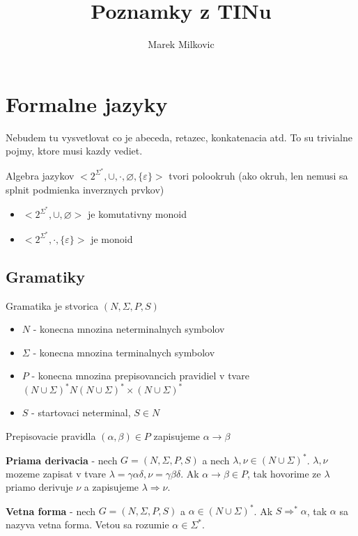 \documentclass[12pt]{article}
\begin{document}
\title{Poznamky z TINu}
\author{Marek Milkovic}
\date{}
\maketitle

\section{Formalne jazyky}
Nebudem tu vysvetlovat co je abeceda, retazec, konkatenacia atd. To su trivialne pojmy, ktore musi kazdy vediet.

Algebra jazykov $<2^{\Sigma^{*}}, \cup, \cdot, \varnothing, \{\varepsilon\}>$ tvori polookruh (ako okruh, len nemusi sa splnit
podmienka inverznych prvkov)
\begin{itemize}
	\item $<2^{\Sigma^{*}}, \cup, \varnothing>$ je komutativny monoid
	\item $<2^{\Sigma^{*}}, \cdot, \{\varepsilon\}>$ je monoid
\end{itemize}

\subsection*{Gramatiky}
Gramatika je stvorica $(N, \Sigma, P, S)$
\begin{itemize}
	\item $N$ - konecna mnozina neterminalnych symbolov
	\item $\Sigma$ - konecna mnozina terminalnych symbolov
	\item $P$ - konecna mnozina prepisovancich pravidiel v tvare $(N \cup \Sigma)^{*}N(N \cup \Sigma)^{*} \times (N \cup \Sigma)^{*}$
	\item $S$ - startovaci neterminal, $S \in N$
\end{itemize}

Prepisovacie pravidla $(\alpha, \beta) \in P$ zapisujeme $\alpha \to \beta$

\textbf{Priama derivacia} - nech $G = (N, \Sigma, P, S)$ a nech $\lambda, \nu \in (N \cup \Sigma)^{*}$.
$\lambda,\nu$ mozeme zapisat v tvare $\lambda = \gamma\alpha\delta, \nu = \gamma\beta\delta$. Ak $\alpha \to \beta \in P$,
tak hovorime ze $\lambda$ priamo derivuje $\nu$ a zapisujeme $\lambda \Rightarrow \nu$.

\textbf{Vetna forma} - nech $G = (N, \Sigma, P, S)$ a $\alpha \in (N \cup \Sigma)^{*}$. Ak $S \Rightarrow^{*} \alpha$,
tak $\alpha$ sa nazyva vetna forma. Vetou sa rozumie $\alpha \in \Sigma^{*}$.
\end{document}
